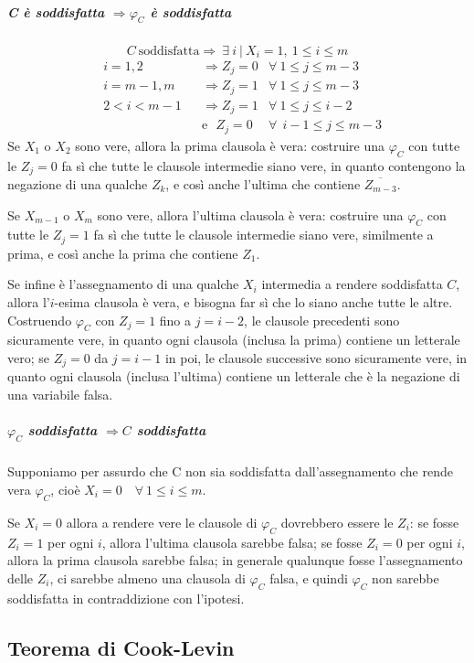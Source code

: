 \subparagraph{C è soddisfatta $\Rightarrow \varphi_C$ è soddisfatta}
$$C \ \text{soddisfatta} \Rightarrow \ \exists \ i \ | \ X_i=1, \ 1\leq i \leq m$$
\begin{align}
 & i = 1,2  & & \Rightarrow Z_j = 0 & \forall \ 1\leq j \leq m-3  \\
 & i = m-1,m & & \Rightarrow Z_j = 1  & \forall \ 1\leq j \leq m-3 \\
 & 2 < i < m-1 &  & \Rightarrow Z_j = 1  & \forall  \ 1 \leq j \leq i-2 \\  
 & & & \text{e} \ \ \ Z_j = 0 &  \forall \ \ i-1\leq j \leq m-3 \nonumber
\end{align}
Se $X_1$ o $X_2$ sono vere, allora la prima clausola è vera: costruire una $\varphi_C$ con tutte le $Z_j = 0$ fa sì che tutte le clausole intermedie siano vere, in quanto contengono la negazione di una qualche $Z_k$, e così anche l'ultima che contiene $\overline{Z_{m-3}}$.

Se $X_{m-1}$ o $X_m$ sono vere, allora l'ultima clausola è vera: costruire una $\varphi_C$ con tutte le $Z_j = 1$ fa sì che tutte le clausole intermedie siano vere, similmente a prima, e così anche la prima che contiene $Z_1$.

Se infine è l'assegnamento di una qualche $X_i$ intermedia a rendere soddisfatta $C$, allora l'$i$-esima clausola è vera, e bisogna far sì che lo siano anche tutte le altre. Costruendo $\varphi_C$ con $Z_j = 1$ fino a $j = i-2$, le clausole precedenti sono sicuramente vere, in quanto ogni clausola (inclusa la prima) contiene un letterale vero; se $Z_j = 0$ da $j=i-1$ in poi, le clausole successive sono sicuramente vere, in quanto ogni clausola (inclusa l'ultima) contiene un letterale che è la negazione di una variabile falsa.

\subparagraph{$\varphi_C$ soddisfatta $\Rightarrow C$ soddisfatta}
\quad
Supponiamo per assurdo che C non sia soddisfatta dall'assegnamento che rende vera $\varphi_C$, cioè $X_i = 0 \quad \forall \ 1 \leq i \leq m$.

Se $X_i = 0 $ allora a rendere vere le clausole di $\varphi_C$ dovrebbero essere le $Z_i$: se fosse $Z_i = 1$ per ogni $i$, allora l'ultima clausola sarebbe falsa; se fosse $Z_i = 0$ per ogni $i$, allora la prima clausola sarebbe falsa; in generale qualunque fosse l'assegnamento delle $Z_i$, ci sarebbe almeno una clausola di $\varphi_C$ falsa, e quindi $\varphi_C$ non sarebbe soddisfatta in contraddizione con l'ipotesi.

\subsection{Teorema di Cook-Levin}

